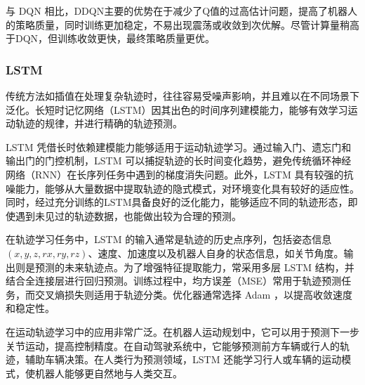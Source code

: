 与 DQN 相比，DDQN主要的优势在于减少了Q值的过高估计问题，提高了机器人的策略质量，同时训练更加稳定，不易出现震荡或收敛到次优解。尽管计算量稍高于DQN，但训练收敛更快，最终策略质量更优。

\subsubsection{LSTM}
传统方法如插值在处理复杂轨迹时，往往容易受噪声影响，并且难以在不同场景下泛化。长短时记忆网络\cite{graves2012long}（LSTM）因其出色的时间序列建模能力，能够有效学习运动轨迹的规律，并进行精确的轨迹预测。

LSTM 凭借长时依赖建模能力能够适用于运动轨迹学习。通过输入门、遗忘门和输出门的门控机制，LSTM 可以捕捉轨迹的长时间变化趋势，避免传统循环神经网络（RNN）在长序列任务中遇到的梯度消失问题。此外，LSTM 具有较强的抗噪能力，能够从大量数据中提取轨迹的隐式模式，对环境变化具有较好的适应性。同时，经过充分训练的LSTM具备良好的泛化能力，能够适应不同的轨迹形态，即使遇到未见过的轨迹数据，也能做出较为合理的预测。

在轨迹学习任务中，LSTM 的输入通常是轨迹的历史点序列，包括姿态信息$(x,y,z,rx,ry,rz)$、速度、加速度以及机器人自身的状态信息，如关节角度。输出则是预测的未来轨迹点。为了增强特征提取能力，常采用多层 LSTM 结构，并结合全连接层进行回归预测。训练过程中，均方误差（MSE）常用于轨迹预测任务，而交叉熵损失则适用于轨迹分类。优化器通常选择 Adam\cite{kingma2014adam} ，以提高收敛速度和稳定性。

 在运动轨迹学习中的应用非常广泛。在机器人运动规划中，它可以用于预测下一步关节运动，提高控制精度。在自动驾驶系统中，它能够预测前方车辆或行人的轨迹，辅助车辆决策。在人类行为预测领域，LSTM 还能学习行人或车辆的运动模式，使机器人能够更自然地与人类交互。






